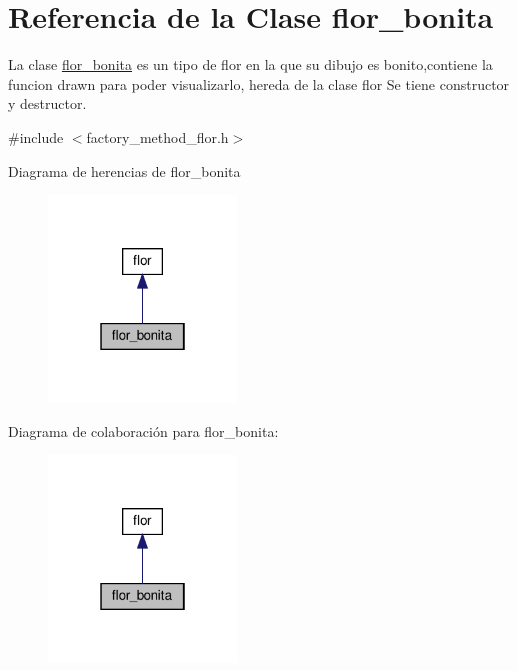 \hypertarget{classflor__bonita}{}\section{Referencia de la Clase flor\+\_\+bonita}
\label{classflor__bonita}


La clase \hyperlink{classflor__bonita}{flor\+\_\+bonita} es un tipo de flor en la que su dibujo es bonito,contiene la funcion drawn para poder visualizarlo, hereda de la clase flor  Se tiene constructor y destructor.  




{\ttfamily \#include $<$factory\+\_\+method\+\_\+flor.\+h$>$}



Diagrama de herencias de flor\+\_\+bonita
\nopagebreak
\begin{figure}[H]
\begin{center}
\leavevmode
\includegraphics[width=142pt]{classflor__bonita__inherit__graph}
\end{center}
\end{figure}


Diagrama de colaboración para flor\+\_\+bonita\+:
\nopagebreak
\begin{figure}[H]
\begin{center}
\leavevmode
\includegraphics[width=142pt]{classflor__bonita__coll__graph}
\end{center}
\end{figure}
